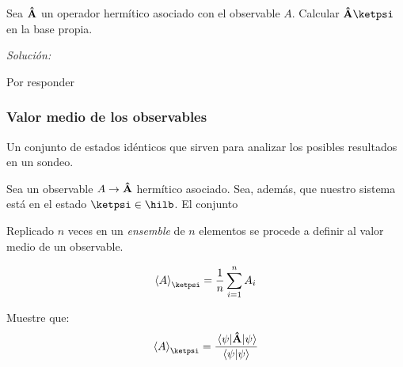          \begin{example}[Deber]
             Sea $\vu{A}$ un operador hermítico asociado con el observable $A$. Calcular $\vu{A}\ketpsi$ en la base propia.

             \textit{Solución:}

             Por responder
         \end{example}

     \subsubsection{Valor medio de los observables}

         \begin{definition}[Ensemble]
             Un conjunto de estados idénticos que sirven para analizar los posibles resultados en un sondeo.
         \end{definition}

         Sea un observable $A\rightarrow\vu{A}$ hermítico asociado. Sea, además, que nuestro sistema está en el estado $\ketpsi\in\hilb$. El conjunto

         Replicado $n$ veces en un \textit{ensemble} de $n$ elementos se procede a definir al valor medio de un observable.

         \begin{definition}
             $$
                 \expval{A}_{\ketpsi}=\frac{1}{n}\sum_{i=1}^nA_i
             $$
         \end{definition}

         \begin{example}
             Muestre que:
             $$
                 \expval{A}_{\ketpsi}=\frac{\expval{\vu{A}}{\psi}}{\braket{\psi}}
             $$
         \end{example}

